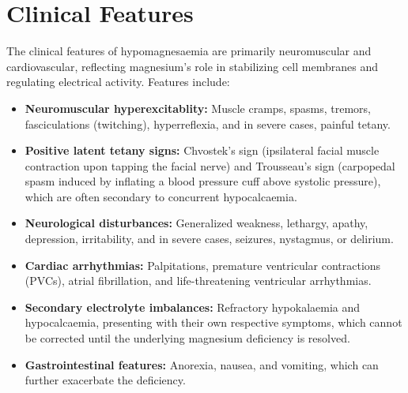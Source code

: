 \section*{Clinical Features}
The clinical features of hypomagnesaemia are primarily neuromuscular and cardiovascular, reflecting magnesium's role in stabilizing cell membranes and regulating electrical activity. Features include:
\begin{itemize}
    \item \textbf{Neuromuscular hyperexcitablity:} Muscle cramps, spasms, tremors, fasciculations (twitching), hyperreflexia, and in severe cases, painful tetany.
    \item \textbf{Positive latent tetany signs:} Chvostek's sign (ipsilateral facial muscle contraction upon tapping the facial nerve) and Trousseau's sign (carpopedal spasm induced by inflating a blood pressure cuff above systolic pressure), which are often secondary to concurrent hypocalcaemia.
    \item \textbf{Neurological disturbances:} Generalized weakness, lethargy, apathy, depression, irritability, and in severe cases, seizures, nystagmus, or delirium.
    \item \textbf{Cardiac arrhythmias:} Palpitations, premature ventricular contractions (PVCs), atrial fibrillation, and life-threatening ventricular arrhythmias.
    \item \textbf{Secondary electrolyte imbalances:} Refractory hypokalaemia and hypocalcaemia, presenting with their own respective symptoms, which cannot be corrected until the underlying magnesium deficiency is resolved.
    \item \textbf{Gastrointestinal features:} Anorexia, nausea, and vomiting, which can further exacerbate the deficiency.
\end{itemize}

